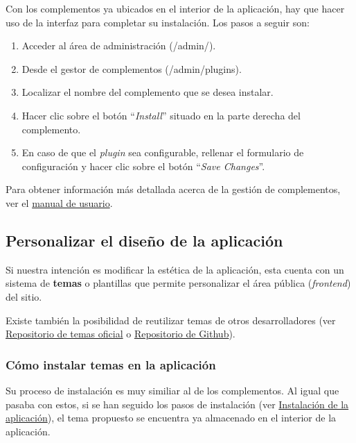 Con los complementos ya ubicados en el interior de la aplicación, hay
que hacer uso de la interfaz para completar su instalación. Los pasos a
seguir son:

\begin{enumerate}
\def\labelenumi{\arabic{enumi}.}
\tightlist
\item
  Acceder al área de administración ({/admin/}).
\item
  Desde el gestor de complementos ({/admin/plugins}).
\item
  Localizar el nombre del complemento que se desea instalar.
\item
  Hacer clic sobre el botón ``\emph{Install}'' situado en la parte derecha
  del complemento.
\item
  En caso de que el \emph{plugin} sea configurable, rellenar el
  formulario de configuración y hacer clic sobre el botón ``\emph{Save
  Changes}''.
\end{enumerate}

Para obtener información más detallada acerca de la gestión de
complementos, ver el
\href{https://tfg-ceniehariadne.readthedocs.io/es/latest/anexos/E_Manual_usuario.html\#manual-de-usuario}{manual
de usuario}.

\subsection{Personalizar el diseño de la aplicación}

Si nuestra intención es modificar la estética de la aplicación, esta
cuenta con un sistema de \textbf{temas} o plantillas que permite
personalizar el área pública (\emph{frontend}) del sitio.

Existe también la posibilidad de reutilizar temas de otros
desarrolladores (ver
\href{https://omeka.org/classic/themes/}{Repositorio de temas oficial} o
\href{https://daniel-km.github.io/UpgradeToOmekaS/omeka_themes.html}{Repositorio
de Github}).

\subsubsection{Cómo instalar temas en la aplicación}

Su proceso de instalación es muy similiar al de los complementos. Al
igual que pasaba con estos, si se han seguido los pasos de instalación
(ver \protect\hyperlink{instalaciuxf3n-de-la-aplicaciuxf3n}{Instalación
de la aplicación}), el tema propuesto se encuentra ya almacenado en el
interior de la aplicación.

